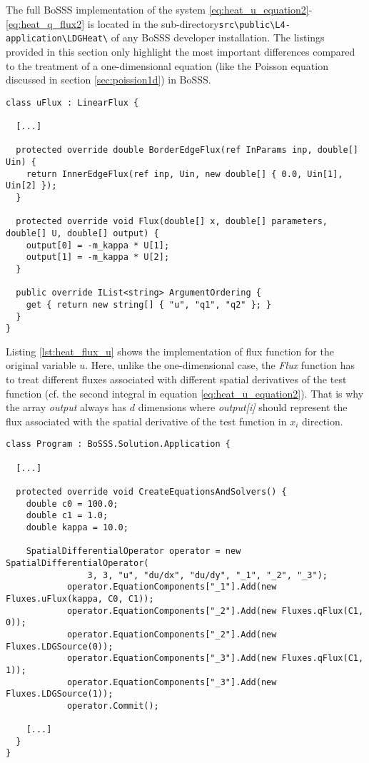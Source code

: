 The full BoSSS implementation of the system
\ref{eq:heat_u_equation2}-\ref{eq:heat_q_flux2} is located in the 
sub-directory\linebreak \verb|src\public\L4-application\LDGHeat\| of any BoSSS developer 
installation. The listings provided in this section only highlight the most 
important differences compared to the treatment of a one-dimensional equation 
(like the Poisson equation discussed in section \ref{sec:poission1d}) in BoSSS.

\begin{lstlisting}[caption=BoSSS implementation of equations 
\ref{eq:heat_u_equation2} and \ref{eq:heat_u_flux2}, label=lst:heat_flux_u]
class uFlux : LinearFlux {
    
  [...]
    
  protected override double BorderEdgeFlux(ref InParams inp, double[] Uin) {
    return InnerEdgeFlux(ref inp, Uin, new double[] { 0.0, Uin[1], Uin[2] });
  }
  
  protected override void Flux(double[] x, double[] parameters, double[] U, double[] output) {
    output[0] = -m_kappa * U[1];
    output[1] = -m_kappa * U[2];
  }
  
  public override IList<string> ArgumentOrdering {
    get { return new string[] { "u", "q1", "q2" }; }
  }
}
\end{lstlisting}

Listing \ref{lst:heat_flux_u} shows the implementation of flux function for the
original variable $u$. Here, unlike the one-dimensional case, the \emph{Flux} 
function has to treat different fluxes associated with different spatial 
derivatives of the test function (cf. the second integral in equation
\ref{eq:heat_u_equation2}). That is why the array \emph{output} always has $d$ 
dimensions where \emph{output[i]} should represent the flux associated with the
spatial derivative of the test function in $x_i$ direction.

\begin{lstlisting}[caption=Assembly of the DG operator for the heat equation, 
label=lst:heat_operator]
class Program : BoSSS.Solution.Application {

  [...]
  
  protected override void CreateEquationsAndSolvers() {
    double c0 = 100.0;
    double c1 = 1.0;
    double kappa = 10.0;

    SpatialDifferentialOperator operator = new SpatialDifferentialOperator(
                3, 3, "u", "du/dx", "du/dy", "_1", "_2", "_3");
            operator.EquationComponents["_1"].Add(new Fluxes.uFlux(kappa, C0, C1));
            operator.EquationComponents["_2"].Add(new Fluxes.qFlux(C1, 0));
            operator.EquationComponents["_2"].Add(new Fluxes.LDGSource(0));
            operator.EquationComponents["_3"].Add(new Fluxes.qFlux(C1, 1));
            operator.EquationComponents["_3"].Add(new Fluxes.LDGSource(1));
            operator.Commit();

    [...]
  }
}
\end{lstlisting}

